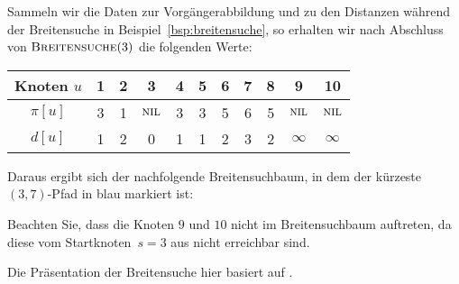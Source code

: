 \begin{bsp}
Sammeln wir die Daten zur Vorgängerabbildung und zu den Distanzen während der Breitensuche in Beispiel~\ref{bsp:breitensuche}, so erhalten wir nach Abschluss von $\mathop{\text{\textsc{Breitensuche}}}(3)$ die folgenden Werte:

\begin{table}[H]
\centering
\begin{tabular}{|c|c|c|c|c|c|c|c|c|c|c|}
\hline
\textbf{Knoten $u$}        & \textbf{1} & \textbf{2} & \textbf{3} & \textbf{4} & \textbf{5} & \textbf{6} & \textbf{7} & \textbf{8} & \textbf{9} & \textbf{10} \\ \hline
\textbf{$\pi[u]$}    & 3          & 1          & $\mathop{\text{\textsc{nil}}}$          & 3          & 3          & 5          & 6         & 5         & $\mathop{\text{\textsc{nil}}}$         & $\mathop{\text{\textsc{nil}}}$          \\ \hline
\textbf{$d[u]$} & 1          & 2          & 0         & 1          & 1         & 2         & 3         & 2         & $\infty$         & $\infty$          \\ \hline
\end{tabular}
\end{table}

Daraus ergibt sich der nachfolgende Breitensuchbaum, in dem der kürzeste $(3,7)$-Pfad in blau markiert ist:

\begin{center} 
\end{center} 

Beachten Sie, dass die Knoten $9$ und $10$ nicht im Breitensuchbaum auftreten, da diese vom Startknoten~$s=3$ aus nicht erreichbar sind.
\end{bsp}

\begin{bem}
	Die Präsentation der Breitensuche hier basiert auf \cite{CLRS17}. 
\end{bem} 
